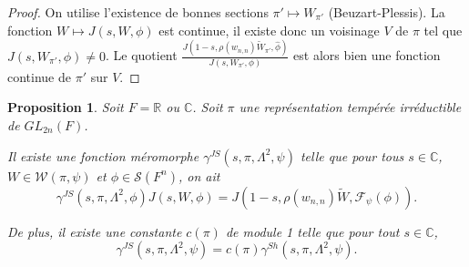 \documentclass{amsart}
\newtheorem{proposition}{Proposition}[section]
\begin{document}
 \begin{proof}
 On utilise l'existence de bonnes sections $\pi' \mapsto W_{\pi'}$ (Beuzart-Plessis). La fonction $W \mapsto J(s, W, \phi)$ est continue, il existe donc un voisinage $V$ de $\pi$ tel que $J(s, W_{\pi'}, \phi) \neq 0$. Le quotient $\frac{J(1-s, \rho(w_{n,n})\tilde{W}_{\pi'}, \hat{\phi})}{J(s, W_{\pi'}, \phi)}$ est alors bien une fonction continue de $\pi'$ sur $V$. 
 \end{proof}
 
 \begin{proposition}
 \label{proparch}
 Soit $F = \mathbb{R}$ ou $\mathbb{C}$. Soit $\pi$ une représentation tempérée irréductible de $GL_{2n}(F)$. 
 
 Il existe une fonction méromorphe $\gamma^{JS}(s,\pi,\Lambda^2,\psi)$ telle que pour tous $s \in \mathbb{C}$, $W \in \mathcal{W}(\pi, \psi)$ et $\phi \in \mathcal{S}(F^n)$, on ait
 \begin{equation}
 \gamma^{JS}(s, \pi, \Lambda^2, \phi) J(s, W, \phi) = J(1-s, \rho(w_{n,n})\tilde{W}, \mathcal{F}_\psi(\phi)).
 \end{equation}
 
 De plus, il existe une constante $c(\pi)$ de module 1 telle que pour tout $s \in \mathbb{C}$,
 \begin{equation}
 \gamma^{JS}(s, \pi, \Lambda^2, \psi) = c(\pi)\gamma^{Sh}(s, \pi, \Lambda^2, \psi).
 \end{equation}
 \end{proposition}
 
\end{document}
